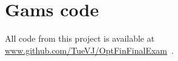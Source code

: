 \section{Gams code\label{sec:appendixcode}}

All code from this project is available at \url{www.github.com/TueVJ/OptFinFinalExam}~.